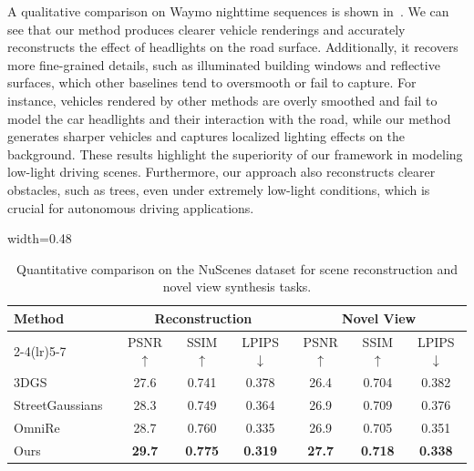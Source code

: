 \documentclass[letterpaper, 10 pt, conference]{ieeeconf}  %
\newcommand{\best}[1]{\cellcolor{best}\textbf{#1}}
\newcommand{\second}[1]{\cellcolor{second}#1}
\begin{document}
A qualitative comparison on Waymo nighttime sequences is shown in~.
We can see that our method produces clearer vehicle renderings and accurately reconstructs the effect of headlights on the road surface. Additionally, it recovers more fine-grained details, such as illuminated building windows and reflective surfaces, which other baselines tend to oversmooth or fail to capture. For instance, vehicles rendered by other methods are overly smoothed and fail to model the car headlights and their interaction with the road, while our method generates sharper vehicles and captures localized lighting effects on the background. These results highlight the superiority of our framework in modeling low-light driving scenes. Furthermore, our approach also reconstructs clearer obstacles, such as trees, even under extremely low-light conditions, which is crucial for autonomous driving applications.






\begin{table}[t]
\caption{Quantitative comparison on the NuScenes dataset for scene reconstruction and novel view synthesis tasks.}
\label{tab:nuscenes}
\centering
\scriptsize
\setlength{\tabcolsep}{4pt}
\renewcommand{\arraystretch}{1.12}
\begin{adjustbox}{width=0.48\textwidth} %
\begin{tabular}{lccc ccc}
\toprule
\multirow{2}{*}{Method} &
\multicolumn{3}{c}{Reconstruction} &
\multicolumn{3}{c}{Novel View} \\
\cmidrule(lr){2-4}\cmidrule(lr){5-7}
& PSNR$\uparrow$ & SSIM$\uparrow$ & LPIPS$\downarrow$
& PSNR$\uparrow$ & SSIM$\uparrow$ & LPIPS$\downarrow$ \\
\midrule
3DGS~\cite{kerbl20233d}
& 27.6  & 0.741 & 0.378
& 26.4 & 0.704 & 0.382 \\

StreetGaussians~\cite{yan2024street}
& 28.3 & 0.749 & 0.364
& 26.9 & \second{0.709} & 0.376 \\

OmniRe~\cite{chen2025omnire}
& \second{28.7} & \second{0.760} & \second{0.335}
& \second{26.9} & 0.705 & \second{0.351} \\

Ours
& \best{29.7} & \best{0.775} & \best{0.319}
& \best{27.7} & \best{0.718} & \best{0.338} \\
\bottomrule
\end{tabular}
\end{adjustbox}
\end{table}
\end{document}

